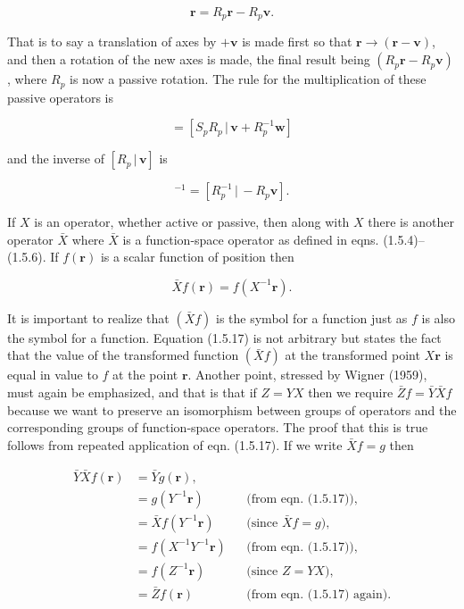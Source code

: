 \documentclass[11pt,a4paper,twoside,openright]{book}
\begin{document}
\begin{equation*}
[R_{p} \,|\, \mathbf{v}]\mathbf{r} = R_{p}\mathbf{r} - R_{p}\mathbf{v}. \tag{1.5.14}
\end{equation*}

That is to say a translation of axes by $+\mathbf{v}$ is made first so that $\mathbf{r} \rightarrow (\mathbf{r} - \mathbf{v})$, and then a rotation of the new axes is made, the final result being $(R_{p}\mathbf{r} - R_{p}\mathbf{v})$, where $R_{p}$ is now a passive rotation. The rule for the multiplication of these passive operators is

\begin{equation*}
[S_{p} \,|\, \mathbf{w}][R_{p} \,|\, \mathbf{v}] = [S_{p}R_{p} \,|\, \mathbf{v} + R_{p}^{-1}\mathbf{w}] \tag{1.5.15}
\end{equation*}

and the inverse of $[R_{p} \,|\, \mathbf{v}]$ is

\begin{equation*}
[R_{p} \,|\, \mathbf{v}]^{-1} = [R_{p}^{-1} \,|\, -R_{p}\mathbf{v}]. \tag{1.5.16}
\end{equation*}

If $X$ is an operator, whether active or passive, then along with $X$ there is another operator $\bar{X}$ where $\bar{X}$ is a function-space operator as defined in eqns. (1.5.4)–(1.5.6). If $f(\mathbf{r})$ is a scalar function of position then

\begin{equation*}
\bar{X}f(\mathbf{r}) = f(X^{-1}\mathbf{r}). \tag{1.5.17}
\end{equation*}

It is important to realize that $(\bar{X}f)$ is the symbol for a function just as $f$ is also the symbol for a function. Equation (1.5.17) is not arbitrary but states the fact that the value of the transformed function $(\bar{X}f)$ at the transformed point $X\mathbf{r}$ is equal in value to $f$ at the point $\mathbf{r}$. Another point, stressed by Wigner (1959), must again be emphasized, and that is that if $Z = YX$ then we require $\bar{Z}f = \bar{Y}\bar{X}f$ because we want to preserve an isomorphism between groups of operators and the corresponding groups of function-space operators. The proof that this is true follows from repeated application of eqn. (1.5.17). If we write $\bar{X}f = g$ then

\begin{align*}
\bar{Y}\bar{X}f(\mathbf{r}) &= \bar{Y}g(\mathbf{r}), \\
&= g(Y^{-1}\mathbf{r}) &&\text{(from eqn. (1.5.17))}, \\
&= \bar{X}f(Y^{-1}\mathbf{r}) &&\text{(since $\bar{X}f = g$)}, \\
&= f(X^{-1}Y^{-1}\mathbf{r}) &&\text{(from eqn. (1.5.17))}, \\
&= f(Z^{-1}\mathbf{r}) &&\text{(since $Z = YX$)}, \\
&= \bar{Z}f(\mathbf{r}) &&\text{(from eqn. (1.5.17) again)}.
\end{align*}
\end{document}
